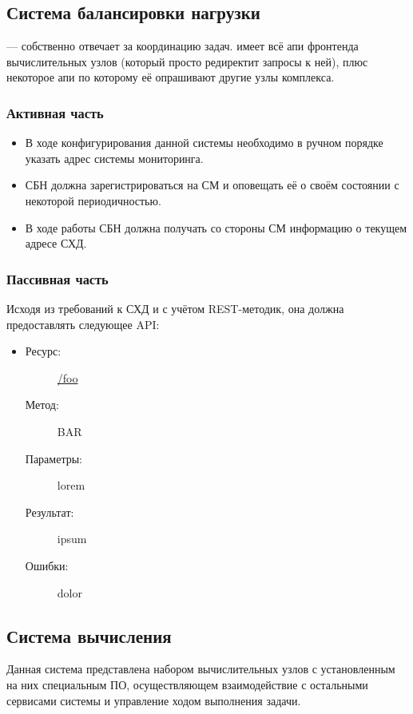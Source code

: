 \documentclass[a4paper,12pt]{report}
\numberwithin{equation}{section}
\begin{document}
\subsection{Система балансировки нагрузки}
--- собственно отвечает за координацию задач. имеет всё апи фронтенда вычислительных узлов (который просто редиректит запросы к ней), плюс некоторое апи по которому её опрашивают другие узлы комплекса.

\subsubsection{Активная часть}
\begin{itemize}
  \item В ходе конфигурирования данной системы необходимо в ручном порядке указать адрес системы мониторинга.
  \item СБН должна зарегистрироваться на СМ и оповещать её о своём состоянии с некоторой периодичностью.
  \item В ходе работы СБН должна получать со стороны СМ информацию о текущем адресе СХД.
\end{itemize}

\subsubsection{Пассивная часть}
Исходя из требований к СХД и с учётом REST-методик, она должна предоставлять следующее API:

\begin{itemize}
  \item
  \begin{description}
    \item[Ресурс:] \url{/foo}
    \item[Метод:] BAR
    \item[Параметры:] lorem
    \item[Результат:] ipsum
    \item[Ошибки:] dolor
  \end{description}
\end{itemize}

\subsection{Система вычисления}
Данная система представлена набором вычислительных узлов с установленным на них специальным ПО, 
осуществляющем взаимодействие с остальными сервисами системы и управление ходом выполнения задачи.
\end{document}
